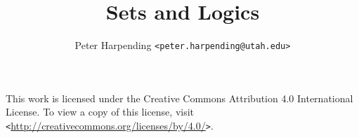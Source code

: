 \documentclass[12pt,oneside,ebook]{memoir}
\newcommand{\monospace}{\texttt}
\newcommand{\barelink}[1]{\monospace{<}\url{#1}\monospace{>}}
\newcommand{\anauthor}[2]{#1 \monospace{<{#2}>}}
\begin{document}
\title{Sets and Logics}
\author{\anauthor{Peter Harpending}{peter.harpending@utah.edu}}
\maketitle

\newpage
{
  \noindent\footnotesize
  This work is licensed under the Creative Commons Attribution 4.0
  International License. To view a copy of this license, visit
  \barelink{http://creativecommons.org/licenses/by/4.0/}.
}
\tableofcontents


\end{document}

